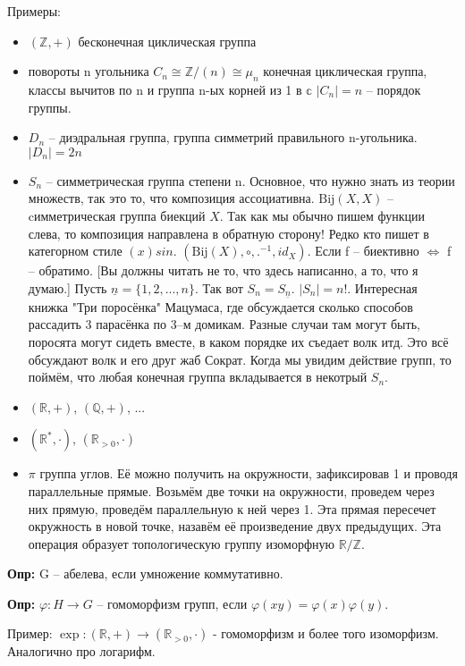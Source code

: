 Примеры:
\begin{itemize}
    \item $(\mathbb{Z},+)$ бесконечная циклическая группа
    \item повороты n угольника $C_n\cong \mathbb{Z}/(n)\cong \mu_n$ конечная
        циклическая группа, классы вычитов по n и группа n-ых корней из 1 в $\mathbb c$
        $|C_n|=n$ – порядок группы.
    \item $D_n$ – диэдральная группа, группа симметрий правильного n-угольника.
        $|D_n|=2n$
    \item $S_n$ – симметрическая группа степени n. Основное, что нужно знать
        из теории множеств, так это то, что композиция ассоциативна. $\text{Bij}(X,X)$ 
        – cимметрическая группа биекций $X$. Так как мы обычно пишем функции
        слева, то композиция направлена в обратную сторону! Редко кто пишет в
        категорном стиле $(x)sin$. $(\text{Bij}(X), \circ, .^{-1}, id_X)$. Если
        f – биективно $\iff$ f – обратимо. [Вы должны читать не то, что здесь
        написанно, а то, что я думаю.] Пусть $\underline{n}=\{1,2,...,n\}$. Так
        вот $S_n=S_{\underline{n}}$. $|S_n|=n!$. Интересная книжка "Три
        поросёнка" Мацумаса, где обсуждается сколько способов рассадить 3
        парасёнка по 3–м домикам. Разные случаи там могут быть, поросята могут
        сидеть вместе, в каком порядке их съедает волк итд. Это всё обсуждают
        волк и его друг жаб Сократ. Когда мы увидим действие групп, то поймём,
        что любая конечная группа вкладывается в некотрый $S_n$.
    \item $(\mathbb{R}, +)$, $(\mathbb{Q}, +)$, ...
    \item $(\mathbb{R}^*, \cdot)$, $(\mathbb{R}_{>0},\cdot)$
    \item $\pi$ группа углов. Её можно получить на окружности, зафиксировав 1
        и проводя параллельные прямые. Возьмём две точки на окружности, проведем
        через них прямую, проведём параллельную к ней через 1. Эта прямая
        пересечет окружность в новой точке, назавём её произведение двух
        предыдущих. Эта операция образует топологическую группу изоморфную 
        $\mathbb{R}/\mathbb{Z}$.
\end{itemize}

\textbf{Опр:} G – абелева, если умножение коммутативно.

\textbf{Опр:} $\varphi: H\longrightarrow G$ – гомоморфизм групп, если
$\varphi(xy)=\varphi(x)\varphi(y)$.

Пример: $\exp: (\mathbb{R}, +)\longrightarrow (\mathbb{R}_{>0},\cdot)$ -
гомоморфизм и более того изоморфизм. Аналогично про логарифм.

